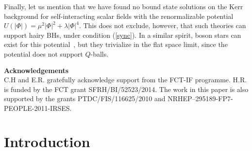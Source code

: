 Finally, let us mention that we have found no bound state solutions on the Kerr background for self-interacting scalar fields with the renormalizable potential $U(|\Phi|) =  \mu^2 |\Phi|^2+\lambda |\Phi|^4$. This does not exclude, however, that such theories can support hairy BHs, under condition (\ref{sync}). In a similar spirit,  boson stars can exist for this potential~\cite{Colpi:1986ye,Schunck:2003kk},  but they trivialize in the flat space limit, since the potential does not support $Q$-balls. 


 

\vspace{0.5cm} 
\noindent
{\bf\large Acknowledgements}\\ 
C.H and E.R. gratefully acknowledge support from the FCT-IF programme. 
 H.R. is funded by the FCT grant SFRH/BI/52523/2014. 
The work in this paper is also supported by the grants PTDC/FIS/116625/2010 and  NRHEP--295189-FP7-PEOPLE-2011-IRSES.
 
 
\section{Introduction}

